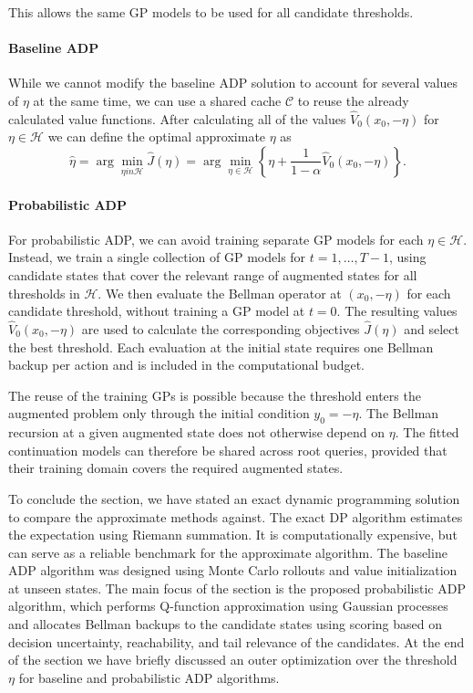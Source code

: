 This allows the same GP models to be used for
all candidate thresholds.


\paragraph{Baseline ADP}

While we cannot modify the baseline ADP solution to account for several values of $\eta$ at the same time, we can use a shared cache $\mathcal{C}$ to reuse the already calculated value functions. After calculating all of the values $\hat{V}_0(x_0, -\eta)$ for $\eta \in \mathcal{H}$ we can define the optimal approximate $\eta$ as
\begin{equation}
	\hat{\eta} = \arg\min_{\eta in \mathcal{H}} \hat{J}(\eta) = \arg\min_{\eta \in \mathcal{H}} \left\{ \eta + \frac{1}{1-\alpha} \hat{V}_0(x_0, -\eta) \right\}.
	\label{optimal-eta-baseline}
\end{equation}

\paragraph{Probabilistic ADP}

For probabilistic ADP, we can avoid training separate GP models for each $\eta \in \mathcal{H}$. Instead, we train a single collection of GP models for $t=1,\ldots,T-1$, using candidate states that cover the relevant range of augmented states for all thresholds in $\mathcal{H}$. We then evaluate the Bellman operator at $(x_0,-\eta)$ for each candidate threshold, without training a GP model at $t=0$. The resulting values $\hat{V}_0(x_0,-\eta)$ are used to calculate the corresponding objectives $\hat{J}(\eta)$ and select the best threshold. Each evaluation at the initial state requires one Bellman backup per action and is included in the computational budget.

The reuse of the training GPs is possible because the threshold enters the augmented problem only through the initial condition $y_0=-\eta$. The Bellman recursion at a given augmented state does not otherwise depend on $\eta$. The fitted continuation models can therefore be shared across root queries, provided that their training domain covers the required augmented states.

To conclude the section, we have stated an exact dynamic programming solution to compare the approximate methods against. The exact DP algorithm estimates the expectation using Riemann summation. It is computationally expensive, but can serve as a reliable benchmark for the approximate algorithm. The baseline ADP algorithm was designed using Monte Carlo rollouts and value initialization at unseen states. The main focus of the section is the proposed probabilistic ADP algorithm, which performs Q-function approximation using Gaussian processes and allocates Bellman backups to the candidate states using scoring based on decision uncertainty, reachability, and tail relevance of the candidates. At the end of the section we have briefly discussed an outer optimization over the threshold $\eta$ for baseline and probabilistic ADP algorithms.